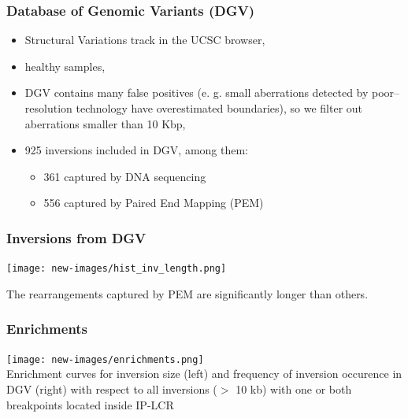 \begin{frame}\frametitle{Database of Genomic Variants (DGV)}  
\begin{itemize} 
 \item Structural Variations track in the UCSC browser, 
 \item healthy samples,
 \item DGV contains many false positives (e. g. small aberrations detected by poor–resolution technology have overestimated boundaries), so we filter out aberrations smaller than 10 Kbp,
 \item 925 inversions included in DGV, among them:
  \begin{itemize}
  \item 361 captured by DNA sequencing 
  \item 556 captured by Paired End Mapping (PEM)
  \end{itemize}
\end{itemize}
\end{frame}


\begin{frame}\frametitle{Inversions from DGV} 

 
 	    \begin{center}
	   \texttt{[image: new-images/hist\_inv\_length.png]}\\
 	    \end{center}
The rearrangements captured by PEM are significantly longer than others.  
\end{frame}


\begin{frame}\frametitle{Enrichments}  
	   \texttt{[image: new-images/enrichments.png]}\\
           \small{Enrichment curves for inversion size (left) and frequency of inversion occurence in
DGV (right) with respect to all inversions ($>$ 10 kb) with one or both breakpoints located inside
IP-LCR}
\end{frame}





